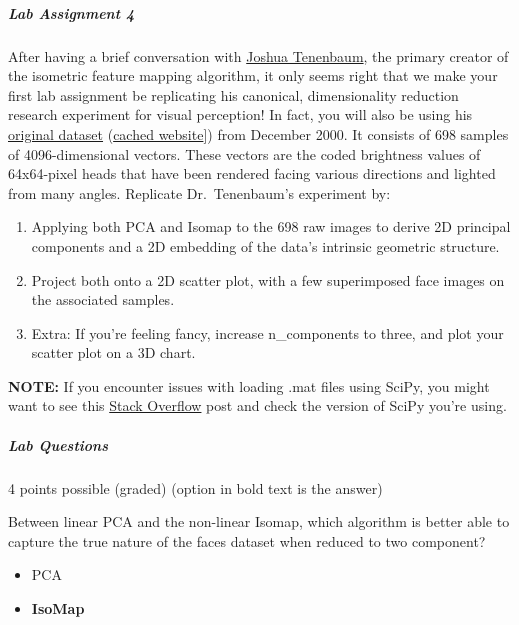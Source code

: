 \documentclass[11pt]{article}
\providecommand{\tightlist}{%
      \setlength{\itemsep}{0pt}\setlength{\parskip}{0pt}}
\begin{document}
\hypertarget{lab-assignment-4}{%
\subparagraph{Lab Assignment 4}\label{lab-assignment-4}}

After having a brief conversation with
\href{https://en.wikipedia.org/wiki/Joshua_Tenenbaum}{Joshua Tenenbaum},
the primary creator of the isometric feature mapping algorithm, it only
seems right that we make your first lab assignment be replicating his
canonical, dimensionality reduction research experiment for visual
perception! In fact, you will also be using his
\href{https://github.com/authman/DAT210x/blob/master/Cached\%20Datasets/face_data.zip}{original
dataset}
(\href{https://web.archive.org/web/20160913051505/http://isomap.stanford.edu/datasets.html}{cached
website}{]}) from December 2000. It consists of 698 samples of
4096-dimensional vectors. These vectors are the coded brightness values
of 64x64-pixel heads that have been rendered facing various directions
and lighted from many angles. Replicate Dr.~Tenenbaum's experiment by:

\begin{enumerate}
\def\labelenumi{\arabic{enumi}.}
\tightlist
\item
  Applying both PCA and Isomap to the 698 raw images to derive 2D
  principal components and a 2D embedding of the data's intrinsic
  geometric structure.
\item
  Project both onto a 2D scatter plot, with a few superimposed face
  images on the associated samples.
\item
  Extra: If you're feeling fancy, increase n\_components to three, and
  plot your scatter plot on a 3D chart.
\end{enumerate}

\textbf{NOTE:} If you encounter issues with loading .mat files using
SciPy, you might want to see this
\href{http://stackoverflow.com/questions/35283073/scipy-io-loadmat-doesnt-work}{Stack
Overflow} post and check the version of SciPy you're using.

\hypertarget{lab-questions}{%
\subparagraph{Lab Questions}\label{lab-questions}}

4 points possible (graded) (option in bold text is the answer)

Between linear PCA and the non-linear Isomap, which algorithm is better
able to capture the true nature of the faces dataset when reduced to two
component?

\begin{itemize}
\tightlist
\item
  PCA
\item
  \textbf{IsoMap}
\end{itemize}
\end{document}
